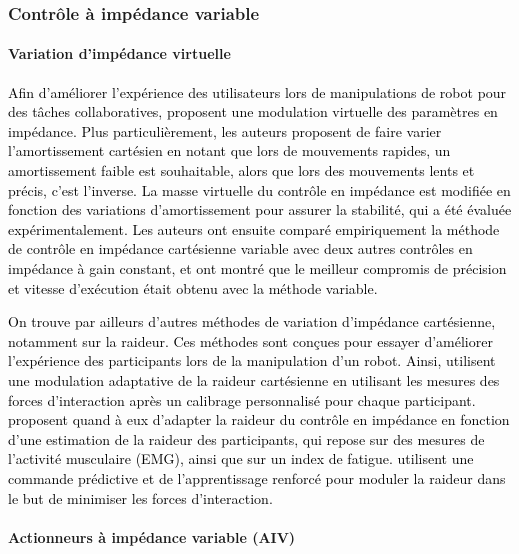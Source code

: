 \subsubsection{Contrôle à impédance variable} \label{chap2_sec_cmd_collab_subsec_cmd_imp_3}

\paragraph{Variation d'impédance virtuelle}

\textcolor{black}{Afin d'améliorer l'expérience des utilisateurs lors de manipulations de robot pour des tâches collaboratives, \textcite{ficuciello_variable_2015} proposent une modulation virtuelle des paramètres en impédance. Plus particulièrement, les auteurs proposent de faire varier l'amortissement cartésien en notant que lors de mouvements rapides, un amortissement faible est souhaitable, alors que lors des mouvements lents et précis, c'est l'inverse. La masse virtuelle du contrôle en impédance est modifiée en fonction des variations d'amortissement pour assurer la stabilité, qui a été évaluée expérimentalement. %
Les auteurs ont ensuite comparé empiriquement la méthode de contrôle en impédance cartésienne variable avec deux autres contrôles en impédance à gain constant, et ont montré que le meilleur compromis de précision et vitesse d'exécution était obtenu avec la méthode variable.}

\textcolor{black}{On trouve par ailleurs d'autres méthodes de variation d'impédance cartésienne, notamment sur la raideur. Ces méthodes sont conçues pour essayer d'améliorer l'expérience des participants lors de la manipulation d'un robot. Ainsi, \textcite{gopinathan_user_2017} utilisent une modulation adaptative de la raideur cartésienne en utilisant les mesures des forces d'interaction après un calibrage personnalisé pour chaque participant. \textcite{peternel_robot_2018} proposent quand à eux d'adapter la raideur du contrôle en impédance en fonction d'une estimation de la raideur des participants, qui repose sur des mesures de l'activité musculaire (EMG), ainsi que sur un index de fatigue. \textcite{roveda_model-based_2020} utilisent une commande prédictive et de l'apprentissage renforcé pour moduler la raideur dans le but de minimiser les forces d'interaction.}

\paragraph{Actionneurs à impédance variable (AIV)}

